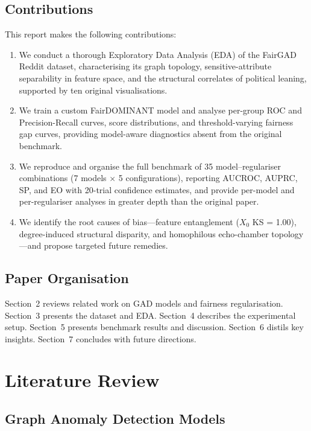 \documentclass[sigconf,natbib=false]{acmart}
\begin{document}
\subsection{Contributions}

This report makes the following contributions:
\begin{enumerate}[leftmargin=*]
    \item We conduct a thorough Exploratory Data Analysis (EDA) of the FairGAD Reddit dataset, characterising its graph topology, sensitive-attribute separability in feature space, and the structural correlates of political leaning, supported by ten original visualisations.
    \item We train a custom FairDOMINANT model and analyse per-group ROC and Precision-Recall curves, score distributions, and threshold-varying fairness gap curves, providing model-aware diagnostics absent from the original benchmark.
    \item We reproduce and organise the full benchmark of 35 model–regulariser combinations (7 models $\times$ 5 configurations), reporting AUCROC, AUPRC, SP, and EO with 20-trial confidence estimates, and provide per-model and per-regulariser analyses in greater depth than the original paper.
    \item We identify the root causes of bias—feature entanglement ($X_0$ KS = 1.00), degree-induced structural disparity, and homophilous echo-chamber topology—and propose targeted future remedies.
\end{enumerate}

\subsection{Paper Organisation}

Section~2 reviews related work on GAD models and fairness regularisation. Section~3 presents the dataset and EDA. Section~4 describes the experimental setup. Section~5 presents benchmark results and discussion. Section~6 distils key insights. Section~7 concludes with future directions.

\section{Literature Review}

\subsection{Graph Anomaly Detection Models}
\end{document}
